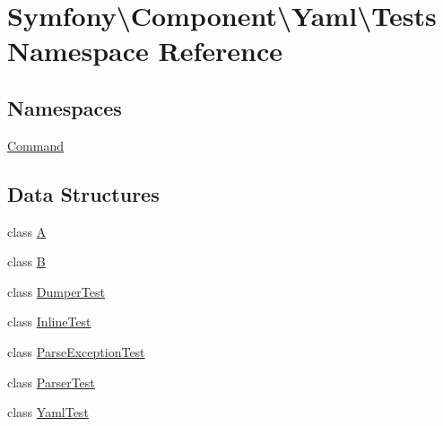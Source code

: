 \hypertarget{namespace_symfony_1_1_component_1_1_yaml_1_1_tests}{}\section{Symfony\textbackslash{}Component\textbackslash{}Yaml\textbackslash{}Tests Namespace Reference}
\label{namespace_symfony_1_1_component_1_1_yaml_1_1_tests}
\subsection*{Namespaces}
\begin{DoxyCompactItemize}
\item 
 \mbox{\hyperlink{namespace_symfony_1_1_component_1_1_yaml_1_1_tests_1_1_command}{Command}}
\end{DoxyCompactItemize}
\subsection*{Data Structures}
\begin{DoxyCompactItemize}
\item 
class \mbox{\hyperlink{class_symfony_1_1_component_1_1_yaml_1_1_tests_1_1_a}{A}}
\item 
class \mbox{\hyperlink{class_symfony_1_1_component_1_1_yaml_1_1_tests_1_1_b}{B}}
\item 
class \mbox{\hyperlink{class_symfony_1_1_component_1_1_yaml_1_1_tests_1_1_dumper_test}{Dumper\+Test}}
\item 
class \mbox{\hyperlink{class_symfony_1_1_component_1_1_yaml_1_1_tests_1_1_inline_test}{Inline\+Test}}
\item 
class \mbox{\hyperlink{class_symfony_1_1_component_1_1_yaml_1_1_tests_1_1_parse_exception_test}{Parse\+Exception\+Test}}
\item 
class \mbox{\hyperlink{class_symfony_1_1_component_1_1_yaml_1_1_tests_1_1_parser_test}{Parser\+Test}}
\item 
class \mbox{\hyperlink{class_symfony_1_1_component_1_1_yaml_1_1_tests_1_1_yaml_test}{Yaml\+Test}}
\end{DoxyCompactItemize}
